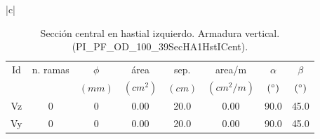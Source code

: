 \begin{table}
\begin{center}
\begin{tabular}{|c|}
\begin{tabular}{cccccccc}
Id & n. ramas & $\phi$ & área & sep. & area/m & $\alpha$ & $\beta$\\
 &  & $(mm)$ & $(cm^2)$ & $(cm)$ & $(cm^2/m)$ & $( \degree)$ & $( \degree)$\\
\hline
Vz & 0 & 0 &  0.00 & 20.0 &  0.00 & 90.0 & 45.0\\
\hline
Vy & 0 & 0 &  0.00 & 20.0 &  0.00 & 90.0 & 45.0\\
\end{tabular} \\
\hline
\end{tabular}
\end{center}
\caption{Sección central en hastial izquierdo. Armadura vertical. (PI\_PF\_OD\_100\_39SecHA1HstICent).} \label{informSec}
\end{table}
